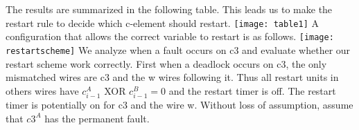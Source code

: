 \documentclass{article}
\begin{document}
\newline
The results are summarized in the following table.  
This leads us to make the restart rule to decide which c-element should restart.  \newline
\texttt{[image: table1]}
A configuration that allows the correct variable to restart is as follows. \newline
\texttt{[image: restartscheme]}
We analyze when a fault occurs on c3 and evaluate whether our restart scheme work correctly.  First when a deadlock occurs on c3, the only mismatched wires are c3 and the w wires following it.  Thus all restart units in others wires have $c_{i-1}^A$ XOR $c_{i-1}^B=0$ and the restart timer is off.  The restart timer is potentially on for c3 and the wire w.  Without loss of assumption, assume that $c3^A$ has the permanent fault.  


\end{document}
